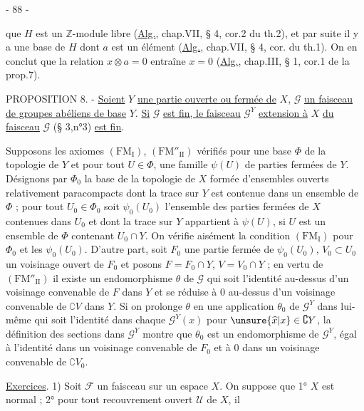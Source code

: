 \begin{center}- 88 -\end{center}
que $H$ est un $\mathbb Z$-module libre (\uline{Alg.}, chap.VII, § 4, cor.2 du th.2), et par suite il y a une base de $H$ dont $a$ est un élément (\uline{Alg.}, chap.VII, § 4, cor. du th.1). On en conclut que la relation $x\otimes a=0$ entraîne $x=0$ (\uline{Alg.}, chap.III, § 1, cor.1 de la prop.7).

PROPOSITION 8. - \uline{Soient} $Y$ \uline{une partie ouverte ou fermée de} $X$, $\mathcal G$ \uline{un faisceau de groupes abéliens de base} $Y$. \uline{Si} $\mathcal G$ \uline{est fin, le faisceau} $\mathcal G^Y$ \uline{extension à} $X$ \uline{du faisceau} $\mathcal G$ (§ 3,n°3) \uline{est fin}.

Supposons les axiomes $(\mathrm{FM}_{\mathrm I})$, $(\mathrm{FM}''_{\mathrm{II}})$ vérifiés pour une base $\Phi$ de la topologie de $Y$ et pour tout $U\in\Phi$, une famille $\psi(U)$ de parties fermées de $Y$. Désignons par $\Phi_0$ la base de la topologie de $X$ formée d'ensembles ouverts relativement paracompacts dont la trace sur $Y$ est contenue dans un ensemble de $\Phi$ ; pour tout $U_0\in\Phi_0$ soit $\psi_0(U_0)$ l'ensemble des parties fermées de $X$ contenues dans $U_0$ et dont la trace sur $Y$ appartient à $\psi(U)$, si $U$ est un ensemble de $\Phi$ contenant $U_0\cap Y$. On vérifie aisément la condition $(\mathrm{FM}_{\mathrm I})$ pour $\Phi_0$ et les $\psi_0(U_0)$. D'autre part, soit $F_0$ une partie fermée de $\psi_0(U_0)$, $V_0\subset U_0$ un voisinage ouvert de $F_0$ et posons $F=F_0\cap Y$, $V=V_0\cap Y$ ; en vertu de $(\mathrm{FM}''_{\mathrm{II}})$ il existe un endomorphisme $\theta$ de $\mathcal G$ qui soit l'identité au-dessus d'un voisinage convenable de $F$ dans $Y$ et se réduise à $0$ au-dessus d'un voisinage convenable de $\complement V$ dans $Y$. Si on prolonge $\theta$ en une application $\theta_0$ de $\mathcal G^Y$ dans lui-même qui soit l'identité dans chaque $\mathcal G^Y(x)$ pour $\unsure{\widehat x|x}\in\complement Y$, la définition des sections dans $\mathcal G^Y$ montre que $\theta_0$ est un endomorphisme de $\mathcal G^Y$, égal à l'identité dans un voisinage convenable de $F_0$ et à $0$ dans un voisinage convenable de $\complement V_0$.

\uline{Exercices}. 1) Soit $\mathcal F$ un faisceau sur un espace $X$. On suppose que 1° $X$ est normal ; 2° pour tout recouvrement ouvert $\mathcal U$ de $X$, il

